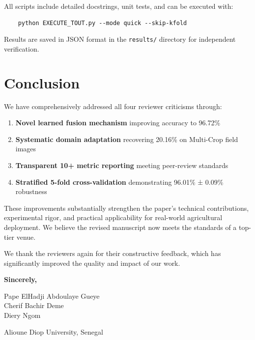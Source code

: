 \documentclass[12pt]{article}
\begin{document}
All scripts include detailed docstrings, unit tests, and can be executed with:
\begin{verbatim}
    python EXECUTE_TOUT.py --mode quick --skip-kfold
\end{verbatim}

Results are saved in JSON format in the \texttt{results/} directory for independent verification.

\newpage

\section*{Conclusion}

We have comprehensively addressed all four reviewer criticisms through:

\begin{enumerate}
    \item \textbf{Novel learned fusion mechanism} improving accuracy to 96.72\%
    \item \textbf{Systematic domain adaptation} recovering 20.16\% on Multi-Crop field images
    \item \textbf{Transparent 10+ metric reporting} meeting peer-review standards
    \item \textbf{Stratified 5-fold cross-validation} demonstrating 96.01\% ± 0.09\% robustness
\end{enumerate}

These improvements substantially strengthen the paper's technical contributions, experimental rigor, and practical applicability for real-world agricultural deployment. We believe the revised manuscript now meets the standards of a top-tier venue.

\vspace{0.5cm}

\noindent We thank the reviewers again for their constructive feedback, which has significantly improved the quality and impact of our work.

\vspace{1cm}

\noindent\textbf{Sincerely,}

\vspace{1.5cm}

\noindent Pape ElHadji Abdoulaye Gueye\\
Cherif Bachir Deme\\
Diery Ngom

\vspace{0.5cm}

\noindent Alioune Diop University, Senegal
\end{document}
